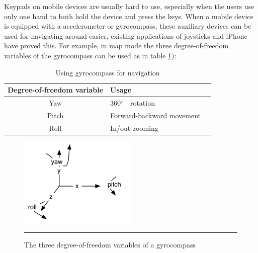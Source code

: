 Keypads on mobile devices are usually hard to use, especially when the users use only one hand to both hold the device and press the keys. When a mobile device is equipped with a accelerometer or gyrocompass, these auxiliary devices can be used for navigating around easier, existing applications of joysticks and iPhone have proved this. For example, in map mode the three degree-of-freedom variables of the gyrocompass can be used as in table \ref{tb:GyrocompassNavigation}):

\begin{table}[tb]
	\begin{center}
		\begin{tabular}{|c|l|l|}
			\hline
			Degree-of-freedom variable & Usage                     \\
			\hline
			Yaw                        & 360$^\circ$　rotation      \\
			Pitch                      & Forward-backward movement \\
			Roll                       & In/out zooming            \\
			\hline
		\end{tabular}
		\label{tb:GyrocompassNavigation}
		\caption{Using gyrocompass for navigation}
	\end{center}
\end{table}

\begin{figure}[htbp]
	\centering
	\includegraphics{./Primitives/yaw_pitch_roll.png}
	\rule{35em}{0.5pt}
	\caption[The three degree-of-freedom variables of a gyrocompass]{The three degree-of-freedom variables of a gyrocompass}
	\label{fig:YawPitchRoll}
\end{figure}
